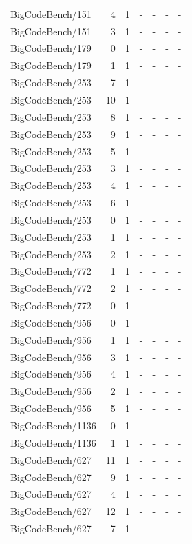 \begin{longtable}{lrrllll}
BigCodeBench/151 & 4 & 1 & - & - & - & - \\
BigCodeBench/151 & 3 & 1 & - & - & - & - \\
BigCodeBench/179 & 0 & 1 & - & - & - & - \\
BigCodeBench/179 & 1 & 1 & - & - & - & - \\
BigCodeBench/253 & 7 & 1 & - & - & - & - \\
BigCodeBench/253 & 10 & 1 & - & - & - & - \\
BigCodeBench/253 & 8 & 1 & - & - & - & - \\
BigCodeBench/253 & 9 & 1 & - & - & - & - \\
BigCodeBench/253 & 5 & 1 & - & - & - & - \\
BigCodeBench/253 & 3 & 1 & - & - & - & - \\
BigCodeBench/253 & 4 & 1 & - & - & - & - \\
BigCodeBench/253 & 6 & 1 & - & - & - & - \\
BigCodeBench/253 & 0 & 1 & - & - & - & - \\
BigCodeBench/253 & 1 & 1 & - & - & - & - \\
BigCodeBench/253 & 2 & 1 & - & - & - & - \\
BigCodeBench/772 & 1 & 1 & - & - & - & - \\
BigCodeBench/772 & 2 & 1 & - & - & - & - \\
BigCodeBench/772 & 0 & 1 & - & - & - & - \\
BigCodeBench/956 & 0 & 1 & - & - & - & - \\
BigCodeBench/956 & 1 & 1 & - & - & - & - \\
BigCodeBench/956 & 3 & 1 & - & - & - & - \\
BigCodeBench/956 & 4 & 1 & - & - & - & - \\
BigCodeBench/956 & 2 & 1 & - & - & - & - \\
BigCodeBench/956 & 5 & 1 & - & - & - & - \\
BigCodeBench/1136 & 0 & 1 & - & - & - & - \\
BigCodeBench/1136 & 1 & 1 & - & - & - & - \\
BigCodeBench/627 & 11 & 1 & - & - & - & - \\
BigCodeBench/627 & 9 & 1 & - & - & - & - \\
BigCodeBench/627 & 4 & 1 & - & - & - & - \\
BigCodeBench/627 & 12 & 1 & - & - & - & - \\
BigCodeBench/627 & 7 & 1 & - & - & - & - \\

\end{longtable}
